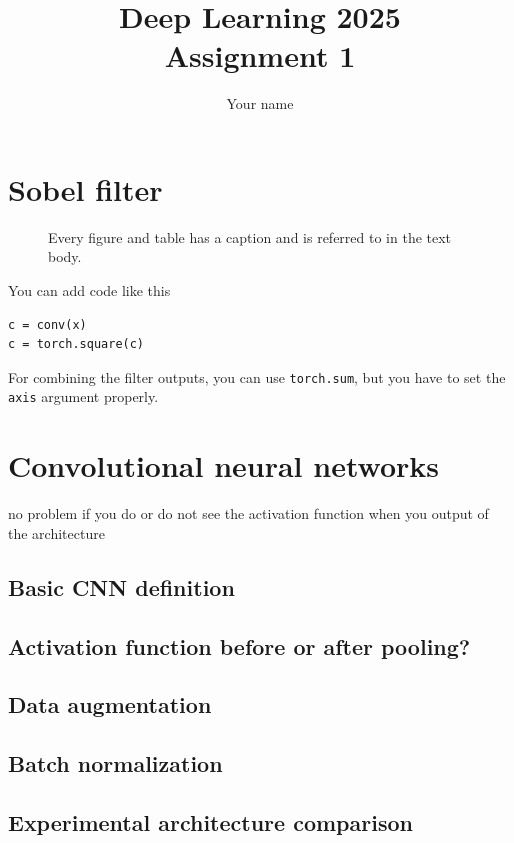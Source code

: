 \documentclass[12pt,a4paper]{article}
\begin{document}
\title{Deep Learning 2025\\Assignment 1}
\author{\color{red}Your name}
\maketitle

\section{Sobel filter}
\begin{figure}
  \begin{center}
  \end{center}
  \caption{Every figure and table has a caption and is referred to 
    in the text body.\label{fig:q6p1}}
\end{figure}



You can add code like this
\begin{lstlisting}
c = conv(x)
c = torch.square(c)
\end{lstlisting}

For combining the filter outputs, you can  use 
\lstinline{torch.sum}, but you have to set the \lstinline{axis}
argument properly.

\section{Convolutional neural networks}

no problem if you do or do not see the activation function when you output of the architecture 


\subsection{Basic CNN definition}
\subsection{Activation function before or after pooling?}
\subsection{Data augmentation}
\subsection{Batch normalization}
\subsection{Experimental architecture comparison}
\end{document}
